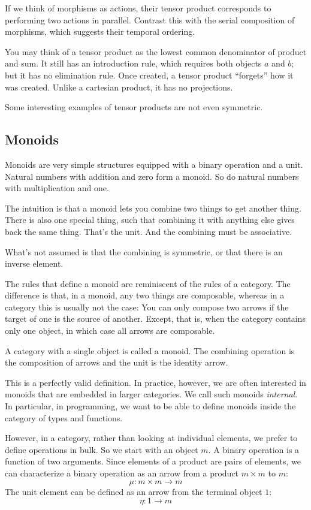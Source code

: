 \documentclass[DaoFP]{subfiles}
\begin{document}
If we think of morphisms as actions, their tensor product corresponds to performing two actions in parallel. Contrast this with the serial composition of morphisms, which suggests their temporal ordering.

You may think of a tensor product as the lowest common denominator of product and sum. It still has an introduction rule, which requires both objects $a$ and $b$; but it has no elimination rule. Once created, a tensor product ``forgets'' how it was created. Unlike a cartesian product, it has no projections. 

Some interesting examples of tensor products are not even symmetric. 

\subsection{Monoids}

Monoids are very simple structures equipped with a binary operation and a unit. Natural numbers with addition and zero form a monoid. So do natural numbers with multiplication and one. 

The intuition is that a monoid lets you combine two things to get another thing. There is also one special thing, such that combining it with anything else gives back the same thing. That's the unit. And the combining must be associative. 

What's not assumed is that the combining is symmetric, or that there is an inverse element.

The rules that define a monoid are reminiscent of the rules of a category. The difference is that, in a monoid, any two things are composable, whereas in a category this is usually not the case: You can only compose two arrows if the target of one is the source of another. Except, that is, when the category contains only one object, in which case all arrows are composable.

A category with a single object is called a monoid. The combining operation is the composition of arrows and the unit is the identity arrow. 

This is a perfectly valid definition. In practice, however, we are often interested in monoids that are embedded in larger categories. We call such monoids \emph{internal}. In particular, in programming, we want to be able to define monoids inside the category of types and functions. 

However, in a category, rather than looking at individual elements, we prefer to define operations in bulk. So we start with an object $m$. A binary operation is a function of two arguments. Since elements of a product are pairs of elements, we can characterize a binary operation as an arrow from a product $m \times m$ to $m$:
\[ \mu \colon m \times m \to m \]
The unit element can be defined as an arrow from the terminal object $1$:
\[ \eta \colon 1 \to m \]
\end{document}
